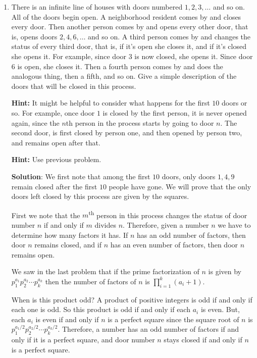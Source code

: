 \documentclass[11pt]{article}
\begin{document}
\begin{enumerate}
\item There is an infinite line of houses with doors numbered $1,2,3,\ldots$ and so on.  All of the doors begin open.  A neighborhood resident comes by and closes every door.  Then another person comes by and opens every other door, that is, opens doors $2,4,6,\ldots$ and so on.  A third person comes by and changes the status of every third door, that is, if it's open she closes it, and if it's closed she opens it.  For example, since door 3 is now closed, she opens it.  Since door 6 is open, she closes it.  Then a fourth person comes by and does the analogous thing, then a fifth, and so on.  Give a simple description of the doors that will be closed in this process.

\textbf{Hint:} It might be helpful to consider what happens for the first $10$ doors or so.  For example, once door $1$ is closed by the first person, it is never opened again, since the $n$th person in the process starts by going to door $n$.  The second door, is first closed by person one, and then opened by person two, and remains open after that.

\textbf{Hint:} Use previous problem. 

{\bf Solution}: We first note that among the first $10$ doors, only doors $1,4,9$ remain closed after the first $10$ people have gone.  We will prove that the only doors left closed by this process are given by the squares.  

First we note that the $m$\textsuperscript{th} person in this process changes the status of door number $n$ if and only if $m$ divides $n$.  Therefore, given a number $n$ we have to determine how many factors it has.  If $n$ has an odd number of factors, then door $n$ remains closed, and if $n$ has an even number of factors, then door $n$ remains open.  

We saw in the last problem that if the prime factorization of $n$ is given by $p_1^{a_1} p_2^{a_2} \cdots p_k^{a_k}$ then the number of factors of $n$ is $\prod_{i=1}^k (a_i+1)$.

When is this product odd?  A product of positive integers is odd if and only if each one is odd.  So this product is odd if and only if each $a_i$ is even.  But, each $a_i$ is even if and only if $n$ is a perfect square since the square root of $n$ is $p_1^{a_1/2} p_2^{a_2/2}\cdots p_k^{a_k/2}$.  Therefore, a number has an odd number of factors if and only if it is a perfect square, and door number $n$ stays closed if and only if $n$ is a perfect square.


\end{enumerate}
\end{document}
